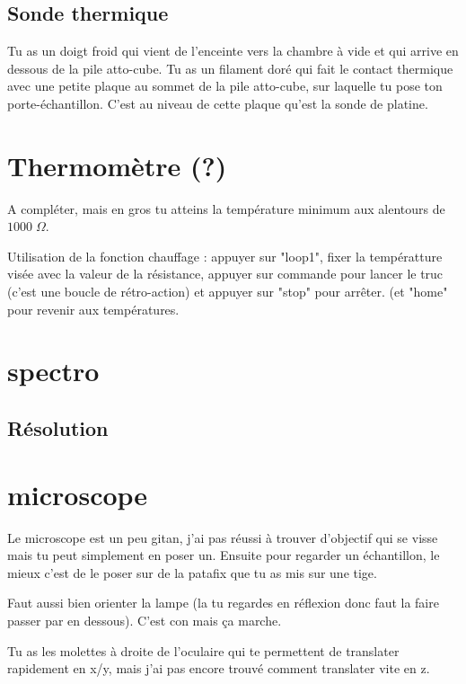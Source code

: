 \documentclass[a4paper]{report}
\begin{document}
  \subsection{Sonde thermique}
  Tu as un doigt froid qui vient de l'enceinte vers la chambre à vide et qui arrive en dessous de la pile atto-cube. Tu as un filament doré qui fait le contact thermique avec une petite plaque au sommet de la pile atto-cube, sur laquelle tu pose ton porte-échantillon. C'est au niveau de cette plaque qu'est la sonde de platine.
 \section{Thermomètre (?)}
 A compléter, mais en gros tu atteins la température minimum aux alentours de $1000 \; \Omega$.
 
 Utilisation de la fonction chauffage : appuyer sur "loop1", fixer la températture visée avec la valeur de la résistance, appuyer sur commande pour lancer le truc (c'est une boucle de rétro-action) et appuyer sur "stop" pour arrêter. (et "home" pour revenir aux températures.
 \section{spectro}
 \subsection{Résolution}
 
 \section{microscope}
 Le microscope est un peu gitan, j'ai pas réussi à trouver d'objectif qui se visse mais tu peut simplement en poser un. Ensuite pour regarder un échantillon, le mieux c'est de le poser sur de la patafix que tu as mis sur une tige.
 
 Faut aussi bien orienter la lampe (la tu regardes en réflexion donc faut la faire passer par en dessous). C'est con mais ça marche.
 
 Tu as les molettes à droite de l'oculaire qui te permettent de translater rapidement en x/y, mais j'ai pas encore trouvé comment translater vite en z.
  
\end{document}
